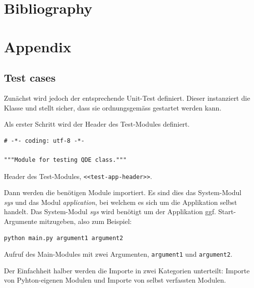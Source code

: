 \documentclass[10pt, openright, notitlepage]{scrreprt}
\begin{document}
\chapter{Bibliography}
\label{sec:org4d8d775}

\printbibliography{}

\chapter{Appendix}
\label{sec:orgb1c4a44}

\section{Test cases}
\label{sec:orge51d7e5}

Zunächst wird jedoch der entsprechende Unit-Test definiert. Dieser instanziert
die Klasse und stellt sicher, dass sie ordnungsgemäss gestartet werden kann.

Als erster Schritt wird der Header des Test-Modules definiert.

\begin{listing}[H]
\begin{verbatim}
# -*- coding: utf-8 -*-

"""Module for testing QDE class."""
\end{verbatim}
\caption{\label{test-app-header}
Header des Test-Modules, \texttt{<<test-app-header>>}.}
\end{listing}

Dann werden die benötigen Module importiert. Es sind dies das System-Modul
\emph{sys} und das Modul \emph{application}, bei welchem es sich um die Applikation
selbst handelt. Das System-Modul \emph{sys} wird benötigt um der Applikation ggf.
Start-Argumente mitzugeben, also zum Beispiel:

\begin{listing}[H]
\begin{verbatim}
python main.py argument1 argument2
\end{verbatim}
\caption{\label{fig:impl-python-call-arguments}
Aufruf des Main-Modules mit zwei Argumenten, \texttt{argument1} und \texttt{argument2}.}
\end{listing}

Der Einfachheit halber werden die Importe in zwei Kategorien unterteilt: Importe
von Pyhton-eigenen Modulen und Importe von selbst verfassten Modulen.
\end{document}
